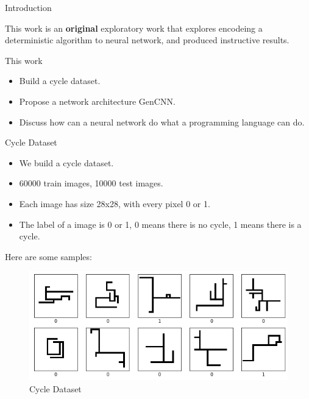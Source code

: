 \documentclass[serif]{beamer}
\begin{document}
\begin{frame}{Introduction}

	This work is an \textbf{original} exploratory work that explores encodeing a deterministic algorithm to neural network, and produced instructive results.

    This work 

    \begin{itemize}

		\item Build a cycle dataset.

		\item Propose a network architecture GenCNN.

		\item Discuss how can a neural network do what a programming language can do.

	\end{itemize}

\end{frame}

\begin{frame}{Cycle Dataset}

	\begin{itemize}

		\item We build a cycle dataset.

		\item 60000 train images, 10000 test images.

		\item Each image has size 28x28, with every pixel 0 or 1.

		\item The label of a image is 0 or 1,
		      0 means there is no cycle, 1 means there is a cycle.

	\end{itemize}

\end{frame}

\begin{frame}{}

	Here are some samples:

	\begin{figure}[H] %
		\centering %
		\includegraphics[width=1.0\textwidth]{../image/img10.png} %
		\caption{Cycle Dataset} %
		\label{Fig.Flow} %
	\end{figure}

\end{frame}
\end{document}
